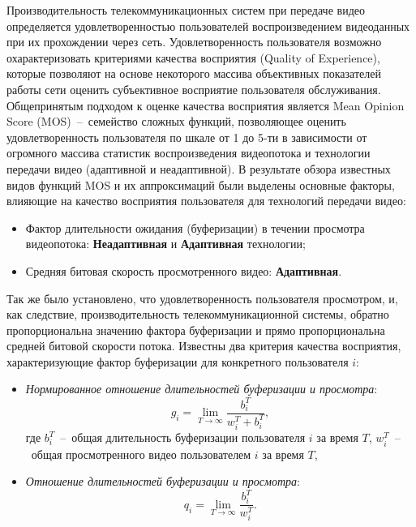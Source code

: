 Производительность телекоммуникационных систем при передаче видео определяется удовлетворенностью пользователей воспроизведением видеоданных при их прохождении через сеть. Удовлетворенность пользователя возможно охарактеризовать критериями качества восприятия (Quality of Experience), которые позволяют на основе некоторого массива объективных показателей работы сети оценить субъективное восприятие пользователя обслуживания. Общепринятым подходом к оценке качества восприятия является Mean Opinion Score (MOS)~--~семейство сложных функций, позволяющее оценить удовлетворенность пользователя по шкале от 1 до 5-ти в зависимости от огромного массива статистик воспроизведения видеопотока и технологии передачи видео (адаптивной и неадаптивной). В результате обзора известных видов функций MOS и их аппроксимаций были выделены основные факторы, влияющие на качество восприятия пользователя для технологий передачи видео:
\begin{itemize}
	\item Фактор длительности ожидания (буферизации) в течении просмотра видеопотока: \textbf{Неадаптивная} и \textbf{Адаптивная} технологии;
	\item Средняя битовая скорость просмотренного видео: \textbf{Адаптивная}.
\end{itemize}
Так же было установлено, что удовлетворенность пользователя просмотром, и, как следствие, производительность телекоммуникационной системы, обратно пропорциональна значению фактора буферизации и прямо пропорциональна средней битовой скорости потока. Известны два критерия качества восприятия, характеризующие фактор буферизации для конкретного пользователя $i$:
\begin{itemize}
	\item \textit{Нормированное отношение длительностей буферизации и просмотра}:
	\begin{equation}
    	\label{eq:g_def}
    	g_i = \lim\limits_{T\rightarrow\infty} \frac{b_i^T}{w_i^T + b_i^T},
    \end{equation}
    где $b_i^T$~--~общая длительность буферизации пользователя $i$ за время $T$, $w_i^T$~--~общая просмотренного видео пользователем $i$ за время $T$,
	\item \textit{Отношение длительностей буферизации и просмотра}:
	\begin{equation}
    	\label{eq:q_def}
    	q_i = \lim\limits_{T\rightarrow\infty} \frac{b_i^T}{w_i^T}.
    \end{equation}
\end{itemize}


